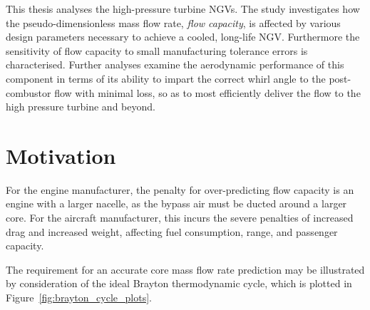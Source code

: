 \documentclass[a4paper, 11pt, oneside]{report}
\begin{document}
This thesis analyses the high-pressure turbine NGVs. The study investigates how the pseudo-\break dimensionless mass flow rate, \textit{flow capacity}, is affected by various design parameters necessary to achieve a cooled, long-life NGV. Furthermore the sensitivity of flow capacity to small manufacturing tolerance errors is characterised. Further analyses examine the aerodynamic performance of this component in terms of its ability to impart the correct whirl angle to the post-combustor flow with minimal loss, so as to most efficiently deliver the flow to the high pressure turbine and beyond.


\section{Motivation}

For the engine manufacturer, the penalty for over-predicting flow capacity is an engine with a larger nacelle, as the bypass air must be ducted around a larger core. For the aircraft manufacturer, this incurs the severe penalties of increased drag and increased weight, affecting fuel consumption, range, and passenger capacity.

The requirement for an accurate core mass flow rate prediction may be illustrated by consideration of the ideal Brayton thermodynamic cycle, which is plotted in Figure~\ref{fig:brayton_cycle_plots}.
\end{document}
